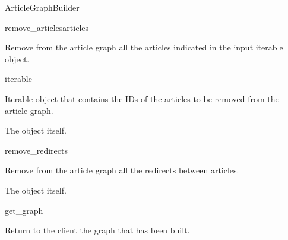 \begin{classdoc}{ArticleGraphBuilder}
\begin{classmethod}{remove\_articles}{articles}
                    \begin{functiondescription}
                        Remove from the article graph all the articles indicated in the input iterable object.
                    \end{functiondescription}
                    
                    \begin{functionparameters}
                        \item[articles] iterable
                        
                        Iterable object that contains the IDs of the articles to be removed from the article graph.
                    \end{functionparameters}
                    
                    \begin{functionoutput}
                        The  object itself.
                    \end{functionoutput}
                \end{classmethod}
                \item \begin{classmethod}{remove\_redirects}{}
                
                    \begin{functiondescription}
                        Remove from the article graph all the redirects between articles.
                    \end{functiondescription}
                    
                    \emptyfunctionparameters{}
                    
                    \begin{functionoutput}
                        The  object itself.
                    \end{functionoutput}
                \end{classmethod}
                \item \begin{classmethod}{get\_graph}{}
                
                    \begin{functiondescription}
                        Return to the client the graph that has been built.
                    \end{functiondescription}
                    

\end{classmethod}
\end{classdoc}
